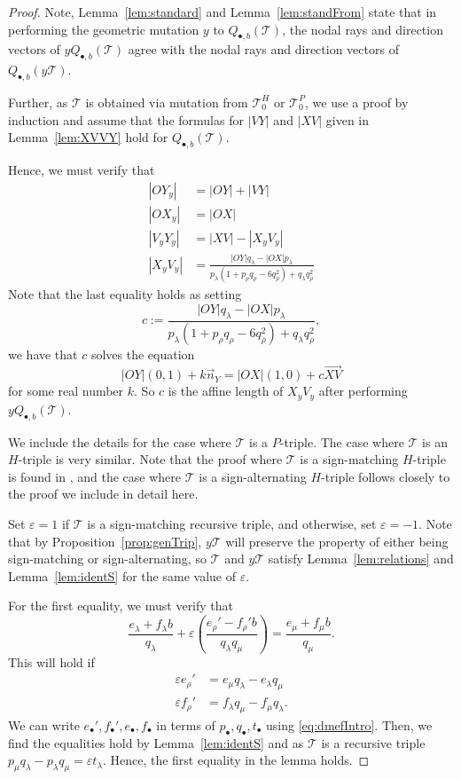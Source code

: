 \documentclass[11pt, reqno]{amsart}
\theoremstyle{remark}
\numberwithin{equation}{subsection}
\numberwithin{figure}{section}
\theoremstyle{customremark}
\newcommand{\Tt}{\mathcal{T}}
\newcommand{\vn}{{\vec{n}}}
\newcommand{\ovr}{\overrightarrow}
\newcommand{\la}{{\lambda}}
\newcommand{\eps}{\varepsilon}
\begin{document}
\begin{proof}
Note, Lemma~\ref{lem:standard} and Lemma~\ref{lem:standFrom} state that in performing the geometric mutation $y$ to $Q_{\bullet,b}(\Tt)$, the nodal rays and direction vectors of $yQ_{\bullet,b}(\Tt)$ agree with the nodal rays and direction vectors of $Q_{\bullet,b}(y\Tt).$ 

Further, as $\Tt$ is obtained via mutation from $\Tt_0^H$ or $\Tt_0^P$, we use a proof by induction and assume that the formulas for $|VY|$ and $|XV|$ given in Lemma~\ref{lem:XVVY} hold for $Q_{\bullet,b}(\Tt).$ 

Hence, we must verify that 
\begin{align*} 
    |OY_y|&=|OY|+|VY| \\
    |OX_y|&=|OX| \\ 
    |V_yY_y|&=|XV|-|X_yV_y| \\ 
    |X_yV_y|&=\frac{|OY|q_\la-|OX|p_\la}{p_\la(1+p_\rho q_\rho-6q_\rho^2)+q_\la q_\rho ^2}
\end{align*}
Note that the last equality holds as setting \[c:=\frac{|OY|q_\la-|OX|p_\la}{p_\la(1+p_\rho q_\rho-6q_\rho^2)+q_\la q_\rho^2},\] we have that $c$ solves the equation 
    \[ |OY|(0,1)+k\vn_Y=|OX|(1,0)+c\ovr{XV}\]
    for some real number $k.$
    So $c$ is the affine length of $X_yV_y$ after performing $yQ_{\bullet,b}(\Tt).$
    
    We include the details for the case where $\Tt$ is a $P$-triple. The case where $\Tt$ is an $H$-triple is very similar. Note that the proof where $\Tt$ is a sign-matching $H$-triple is found in \cite[Lemma 6.2]{M1}, and the case where $\Tt$ is a sign-alternating $H$-triple follows closely to the proof we include in detail here.
   
    Set $\eps=1$ if $\Tt$ is a sign-matching recursive triple, and  otherwise, set $\eps=-1.$ Note that by Proposition~\ref{prop:genTrip}, $y\Tt$ will preserve the property of either being sign-matching or sign-alternating, so $\Tt$ and $y\Tt$ satisfy Lemma~\ref{lem:relations} and Lemma~\ref{lem:identS} for the same value of $\eps.$
    
     For the first equality, we must verify that
    \[ \frac{e_\la+f_\la b}{q_\la}+\eps(\frac{e_\rho'-f_\rho'b}{q_\la q_\mu})=\frac{e_\mu+f_\mu b}{q_\mu}.\]
    This will hold if 
    \begin{align*}
        \eps e_\rho'&=e_\mu q_\la-e_\la q_\mu \\
        \eps f_\rho'&=f_\la q_\mu-f_\mu q_\la.
    \end{align*}
    We can write $e_\bullet',f_\bullet',e_\bullet,f_\bullet$ in terms of $p_\bullet,q_\bullet,t_\bullet$ using \eqref{eq:dmefIntro}. Then, we find the equalities hold by Lemma~\ref{lem:identS} and as $\Tt$ is a recursive triple $p_\mu q_\la-p_\la q_\mu=\eps t_\la.$ Hence, the first equality in the lemma holds. 
    

\end{proof}
\end{document}
